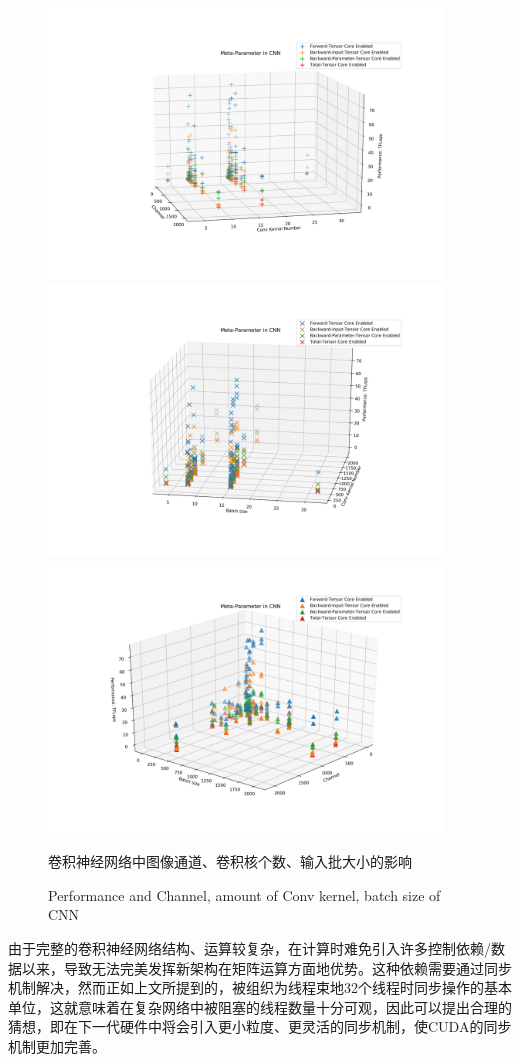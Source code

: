 \begin{figure}
	\centering
	\includegraphics[height=7.2cm]{figures/CNN-CONVN-CH.jpg}\\
	\includegraphics[height=7.2cm]{figures/CNN-CONVN-BS.jpg}\\
	\includegraphics[height=7.2cm]{figures/CNN-CH-BS.jpg}
	\renewcommand{\thefigure}{\arabic{section}-\arabic{figure} }
	\renewcommand{\figurename}{图}
	\caption{卷积神经网络中图像通道、卷积核个数、输入批大小的影响}
	\addtocounter{figure}{-1}
	\renewcommand{\thefigure}{\arabic{section}-\arabic{figure} }
	\renewcommand{\figurename}{Figure}
	\caption{Performance and Channel, amount of Conv kernel, batch size of CNN}
	\label{Fig-CNNMNK}
\end{figure}
\par 由于完整的卷积神经网络结构、运算较复杂，在计算时难免引入许多控制依赖/数据以来，导致无法完美发挥新架构在矩阵运算方面地优势。这种依赖需要通过同步机制解决，然而正如上文所提到的，被组织为线程束地32个线程时同步操作的基本单位，这就意味着在复杂网络中被阻塞的线程数量十分可观，因此可以提出合理的猜想，即在下一代硬件中将会引入更小粒度、更灵活的同步机制，使CUDA的同步机制更加完善。
